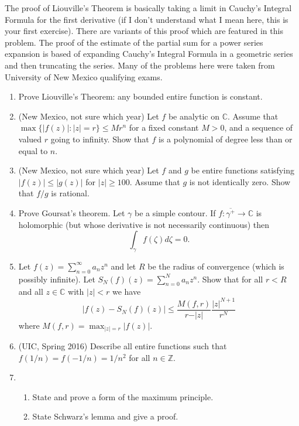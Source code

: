 \documentclass[a4paper,10pt]{article}
\newcommand{\ZZ}{\mathbb{Z}}
\newcommand{\CC}{\mathbb{C}}
\begin{document}
The proof of Liouville's Theorem is basically taking a limit in Cauchy's Integral Formula for the first derivative (if I don't understand what I mean here, this is your first exercise). 
There are variants of this proof which are featured in this problem.
The proof of the estimate of the partial sum for a power series expansion is based of expanding Cauchy's Integral Formula in a geometric series and then truncating the series. 
Many of the problems here were taken from University of New Mexico qualifying exams.

\begin{enumerate}
	\item Prove Liouville's Theorem: any bounded entire function is constant. 

	\item (New Mexico, not sure which year) %
	Let $f$ be analytic on $\CC$. 
	Assume that $\max \lbrace \vert f(z) \vert : \vert z \vert = r \rbrace \leq M r^n$ for a fixed constant $M>0$, and a sequence of valued $r$ going to infinity. 
	Show that $f$ is a polynomial of degree less than or equal to $n$. 
	
	\item (New Mexico, not sure which year) 
	Let $f$ and $g$ be entire functions satisfying $\vert f(z) \vert \leq \vert g(z) \vert$ for $\vert z \vert \geq 100$. Assume that $g$ is not identically zero. Show that $f/g$ is rational. 
	
	\item Prove Goursat's theorem. Let $\gamma$ be a simple contour. If $f:\overline{\gamma^+} \to \CC$ is holomorphic (but whose derivative is not necessarily continuous) then 
	$$ \int_{\gamma} f(\zeta) d\zeta = 0. $$
	
	
	\item Let $f(z) = \sum_{n=0}^{\infty}a_nz^n$ and let $R$ be the radius of convergence (which is possibly infinite). Let $S_N(f)(z) = \sum_{n=0}^N a_n z^n$. 
	Show that for all $r<R$ and all $z \in \CC$ with $\vert z \vert < r$ we have 
	$$ \vert f(z) - S_N(f)(z) \vert \leq \frac{M(f,r)}{r - \vert z \vert} \frac{\vert z \vert^{N+1}}{r^{N}} $$ 
	where $ M(f,r) = \max_{\vert z \vert = r} \vert f(z) \vert. $
	
	\item (UIC, Spring 2016)
	Describe all entire functions such that $f(1/n) = f(-1/n) = 1/n^2$ for all $n\in \ZZ$.
	

		\item 
		
		\begin{enumerate}
		\item State and prove a form of the maximum principle.
		 \item State Schwarz's lemma and give a proof.
		\end{enumerate}
		


\end{enumerate}
\end{document}
